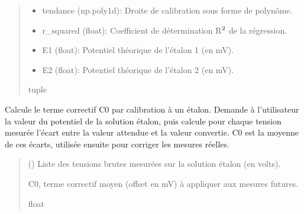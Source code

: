 \documentclass[letterpaper,10pt,english]{sphinxmanual}
\begin{document}
\begin{fulllineitems}
\begin{quote}
\begin{description}
\begin{description}
\begin{itemize}
\item {} 
\sphinxAtStartPar
tendance (np.poly1d): Droite de calibration sous forme de polynôme.

\item {} 
\sphinxAtStartPar
r\_squared (float): Coefficient de détermination R\(\sp{\text{2}}\) de la régression.

\item {} 
\sphinxAtStartPar
E1 (float): Potentiel théorique de l’étalon 1 (en mV).

\item {} 
\sphinxAtStartPar
E2 (float): Potentiel théorique de l’étalon 2 (en mV).

\end{itemize}

\end{description}


\sphinxAtStartPar
tuple

\end{description}\end{quote}

\end{fulllineitems}


\begin{fulllineitems}
\label{\detokenize{calibration:calibration.calibration_etalon}}
\pysigstartsignatures
\pysiglinewithargsret
{}
{}
{}
\pysigstopsignatures
\sphinxAtStartPar

Calcule le terme correctif C0 par calibration à un étalon.
Demande à l’utilisateur la valeur du potentiel de la solution étalon,
puis calcule pour chaque tension mesurée l’écart entre la valeur attendue
et la valeur convertie. C0 est la moyenne de ces écarts, utilisée ensuite
pour corriger les mesures réelles.
\begin{quote}\begin{description}
\sphinxAtStartPar
{} (\sphinxstyleliteralemphasis{\sphinxupquote{{[}}}\sphinxstyleliteralemphasis{\sphinxupquote{{]}}}) \textendash{} Liste des tensions brutes mesurées sur la solution étalon (en volts).

\sphinxAtStartPar
C0, terme correctif moyen (offset en mV) à appliquer aux mesures futures.

\sphinxAtStartPar
float

\end{description}\end{quote}

\end{fulllineitems}
\end{document}
